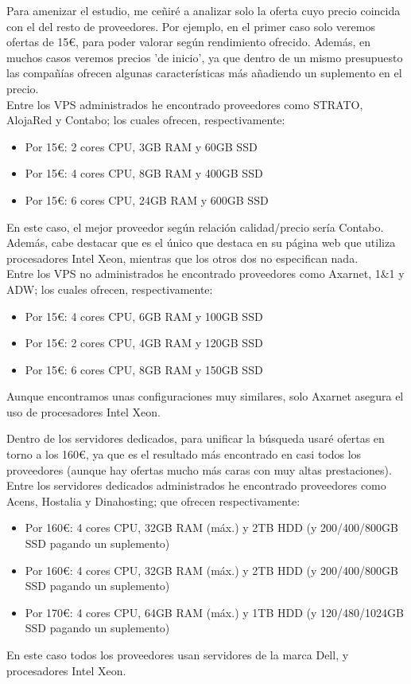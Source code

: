 Para amenizar el estudio, me ceñiré a analizar solo la oferta cuyo precio coincida con el del resto de proveedores. Por ejemplo, en el primer caso
solo veremos ofertas de 15\euro{}, para poder valorar según rendimiento ofrecido. Además, en muchos casos veremos precios 'de inicio', ya que dentro
de un mismo presupuesto las compañías ofrecen algunas características más añadiendo un suplemento en el precio. \\

Entre los VPS administrados he encontrado proveedores como STRATO, AlojaRed y Contabo; los cuales ofrecen, respectivamente:
\begin{itemize}
	\item Por 15\euro{}: 2 cores CPU, 3GB RAM y 60GB SSD \cite{strato}
	\item Por 15\euro{}: 4 cores CPU, 8GB RAM y 400GB SSD \cite{alojared}
	\item Por 15\euro{}: 6 cores CPU, 24GB RAM y 600GB SSD \cite{contabo}
\end{itemize}
En este caso, el mejor proveedor según relación calidad/precio sería Contabo. Además, cabe destacar que es el único que destaca en su página web que
utiliza procesadores Intel Xeon, mientras que los otros dos no especifican nada. \\

Entre los VPS no administrados he encontrado proveedores como Axarnet, 1\&1 y ADW; los cuales ofrecen, respectivamente:
\begin{itemize}
	\item Por 15\euro{}: 4 cores CPU, 6GB RAM y 100GB SSD \cite{axarnet}
	\item Por 15\euro{}: 2 cores CPU, 4GB RAM y 120GB SSD \cite{1and1}
	\item Por 15\euro{}: 6 cores CPU, 8GB RAM y 150GB SSD \cite{adw}
\end{itemize}
Aunque encontramos unas configuraciones muy similares, solo Axarnet asegura el uso de procesadores Intel Xeon.

Dentro de los servidores dedicados, para unificar la búsqueda usaré ofertas en torno a los 160\euro{}, ya que es el resultado más encontrado en casi
todos los proveedores (aunque hay ofertas mucho más caras con muy altas prestaciones). \\

Entre los servidores dedicados administrados he encontrado proveedores como Acens, Hostalia y Dinahosting; que ofrecen respectivamente:
\begin{itemize}
	\item Por 160\euro{}: 4 cores CPU, 32GB RAM (máx.) y 2TB HDD (y 200/400/800GB SSD pagando un suplemento) \cite{acens}
	\item Por 160\euro{}: 4 cores CPU, 32GB RAM (máx.) y 2TB HDD (y 200/400/800GB SSD pagando un suplemento) \cite{hostalia}
	\item Por 170\euro{}: 4 cores CPU, 64GB RAM (máx.) y 1TB HDD (y 120/480/1024GB SSD pagando un suplemento) \cite{dinahosting}
\end{itemize}
En este caso todos los proveedores usan servidores de la marca Dell, y procesadores Intel Xeon.

